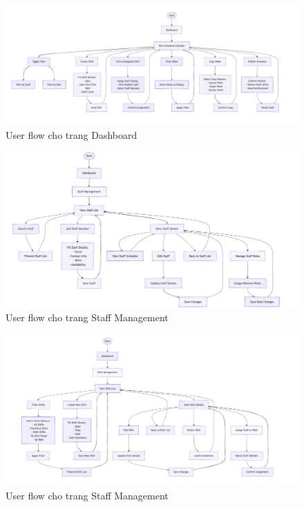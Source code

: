 \begin{figure}[H]
	\centering
	\includegraphics[width=15cm]{Sections/tong_quan/functional_spec/img/dashboard1.png}

     \vspace{0.5cm}
    \caption{User flow cho trang Dashboard}
\end{figure}
\begin{figure}[H]
	\centering
	\includegraphics[width=15cm]{Sections/tong_quan/functional_spec/img/staffmanage1.png}

     \vspace{0.5cm}
    \caption{User flow cho trang Staff Management}
\end{figure}
\begin{figure}[H]
	\centering
	\includegraphics[width=15cm]{Sections/tong_quan/functional_spec/img/shiftmanage1.png}

     \vspace{0.5cm}
    \caption{User flow cho trang Staff Management}
\end{figure}
